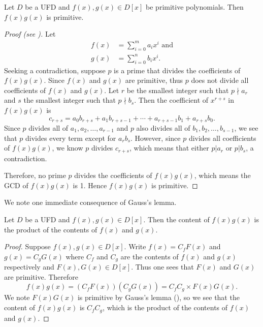 \begin{lemma}[Gauss]\label{lemma-gauss}
    Let $D$ be a UFD and $f(x), g(x) \in D[x]$ be primitive polynomials. Then $f(x)g(x)$ is primitive.
\end{lemma}
\begin{proof}[Proof (see {\cite[Theorem 18.24]{judson_beezer_2022}})]
    Let
    \begin{align*}
        f(x) &= \sum_{i=0}^m a_ix^i \text{ and}\\
        g(x) &= \sum_{i=0}^n b_ix^i.
    \end{align*}
    Seeking a contradiction, suppose $p$ is a prime that divides the coefficients of $f(x)g(x)$. Since $f(x)$ and $g(x)$ are primitive, thus $p$ does not divide all coefficients of $f(x)$ and $g(x)$. Let $r$ be the smallest integer such that $p \nmid a_r$ and $s$ the smallest integer such that $p \nmid b_s$. Then the coefficient of $x^{r+s}$ in $f(x)g(x)$ is
    \[
        c_{r+s} = a_0b_{r+s} + a_1b_{r+s-1} + \cdots + a_{r+s-1}b_1 + a_{r+s}b_0.
    \]
    Since $p$ divides all of $a_1, a_2, \dots, a_{r-1}$ and $p$ also divides all of $b_1, b_2, \dots, b_{s-1}$, we see that $p$ divides every term except for $a_rb_s$. However, since $p$ divides all coefficients of $f(x)g(x)$, we know $p$ divides $c_{r+s}$, which means that either $p \vert a_r$ or $p \vert b_s$, a contradiction.

    Therefore, no prime $p$ divides the coefficients of $f(x)g(x)$, which means the GCD of $f(x)g(x)$ is 1. Hence $f(x)g(x)$ is primitive.
\end{proof}

We note one immediate consequence of Gauss's lemma.

\begin{corollary}\label{corollary-content-of-product-is-product-of-content-for-polynomials}
    Let $D$ be a UFD and $f(x), g(x) \in D[x]$. Then the content of $f(x)g(x)$ is the product of the contents of $f(x)$ and $g(x)$.
\end{corollary}
\begin{proof}
    Suppose $f(x), g(x) \in D[x]$. Write $f(x) = C_f F(x)$ and $g(x) = C_g G(x)$ where $C_f$ and $C_g$ are the contents of $f(x)$ and $g(x)$ respectively and $F(x), G(x) \in D[x]$. Thus one sees that $F(x)$ and $G(x)$ are primitive. Therefore
    \[
        f(x)g(x) = (C_f F(x))(C_g G(x)) = C_fC_g \times F(x)G(x).
    \]
    We note $F(x)G(x)$ is primitive by Gauss's lemma (), so we see that the content of $f(x)g(x)$ is $C_fC_g$, which is the product of the contents of $f(x)$ and $g(x)$.
\end{proof}

